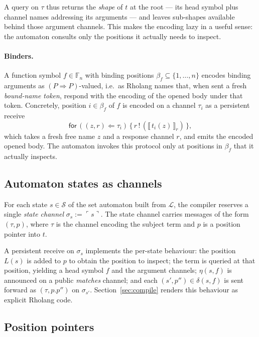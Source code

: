 \documentclass[11pt]{article}
\theoremstyle{plain}
\theoremstyle{definition}
\theoremstyle{remark}
\newcommand{\sem}[1]{\llbracket\,#1\,\rrbracket}
\newcommand{\reflect}[1]{\ulcorner #1 \urcorner}
\newcommand{\States}{\mathcal{S}}
\newcommand{\Lhs}{\mathcal{L}}
\newcommand{\Send}[2]{#1 \,!\, (#2)}
\newcommand{\Bang}[3]{\mathsf{for}\,(#1 \Leftarrow #2)\,\{\,#3\,\}}
\begin{document}
A query on $\tau$ thus returns the \emph{shape} of $t$ at the root --- its
head symbol plus channel names addressing its arguments --- and leaves
sub-shapes available behind those argument channels. This makes the
encoding lazy in a useful sense: the automaton consults only the positions
it actually needs to inspect.

\paragraph{Binders.}
A function symbol $f \in \mathbb{F}_n$ with binding positions
$\beta_f \subseteq \{1, \ldots, n\}$ encodes binding arguments as
$(P \Rightarrow P)$-valued, i.e.\ as Rholang names that, when sent a fresh
\emph{bound-name token}, respond with the encoding of the opened body
under that token. Concretely, position $i \in \beta_f$ of $f$ is encoded
on a channel $\tau_i$ as a persistent receive
\[
  \Bang{(z, r)}{\tau_i}{\Send{r}{\sem{t_i(z)}_{r}}},
\]
which takes a fresh free name $z$ and a response channel $r$, and emits
the encoded opened body. The automaton invokes this protocol only at
positions in $\beta_f$ that it actually inspects.

\subsection{Automaton states as channels}\label{ssec:state-channels}

For each state $s \in \States$ of the set automaton built from $\Lhs$, the
compiler reserves a single \emph{state channel} $\sigma_s := \reflect{s}$.
The state channel carries messages of the form $(\tau, p)$, where $\tau$
is the channel encoding the subject term and $p$ is a position pointer
into $t$.

A persistent receive on $\sigma_s$ implements the per-state behaviour:
the position $L(s)$ is added to $p$ to obtain the position to inspect;
the term is queried at that position, yielding a head symbol $f$ and the
argument channels; $\eta(s, f)$ is announced on a public \emph{matches}
channel; and each $(s', p'') \in \delta(s, f)$ is sent forward as
$(\tau, p.p'')$ on $\sigma_{s'}$. Section~\ref{sec:compile} renders this
behaviour as explicit Rholang code.

\subsection{Position pointers}\label{ssec:pointer-encoding}
\end{document}
